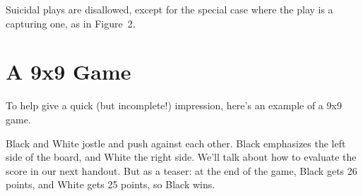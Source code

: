 \documentclass{article}
\begin{document}
\begin{center}
%
\end{center}
Suicidal plays are disallowed, except for the special case where the
play is a capturing one, as in Figure~2.







\section*{A 9x9 Game}
To help give a quick (but incomplete!) impression, here's an example
of a 9x9 game.
%
\begin{center}
\hspace{1in}%
\hspace{1in}%
\end{center}
%
Black and White jostle and push against each other.  Black emphasizes
the left side of the board, and White the right side.  We'll talk
about how to evaluate the score in our next handout.  But as a teaser:
at the end of the game, Black gets 26 points, and White gets 25
points, so Black wins.
\end{document}
